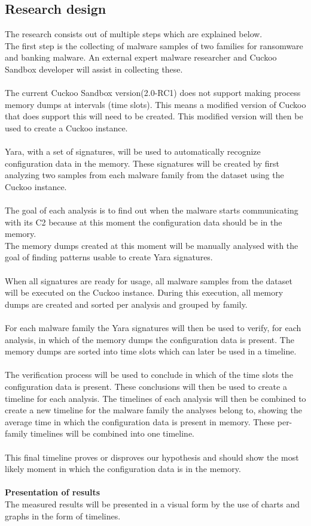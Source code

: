 \documentclass[conference]{IEEEtran}
\begin{document}
\subsection{Research design}
The research consists out of  multiple steps which are explained below.\\

The first step is the collecting of malware samples of two families for ransomware and banking malware. An external expert malware researcher and Cuckoo Sandbox developer will assist in collecting these. \\\\The current Cuckoo Sandbox version(2.0-RC1) does not support making process memory dumps at intervals (\Gls{time slots}). This means a modified version of Cuckoo that does support this will need to be created. This modified version will then be used to create a Cuckoo instance.\\\\Yara, with a set of signatures, will be used to automatically recognize configuration data in the memory. These signatures will be created by first analyzing two samples from each malware family from the dataset using the Cuckoo instance. \\\\The goal of each analysis is to find out when the malware starts communicating with its C2 because at this moment the configuration data should be in the memory.\\The memory dumps created at this moment will be manually analysed with the goal of finding patterns usable to create Yara signatures.\\\\ When all signatures are ready for usage, all malware samples from the dataset will be executed on the Cuckoo instance. During this execution, all memory dumps are created and sorted per analysis and grouped by family.\\\\For each malware family the Yara signatures will then be used to verify, for each analysis, in which of the memory dumps the configuration data is present. The memory dumps are sorted into time slots which can later be used in a timeline.\\\\The verification process will be used to conclude in which of the time slots the configuration data is present. These conclusions will then be used to create a timeline for each analysis.  The timelines of each analysis will then be combined to create a new timeline for the malware family the analyses belong to, showing the average time in which the configuration data is present in memory. These per-family timelines will be combined into one timeline. \\\\This final timeline proves or disproves our hypothesis and should show the most likely moment in which the configuration data is in the memory.\\\\ \textbf{Presentation of results}\\
The measured results will be presented in a visual form by the use of charts and graphs in the form of timelines.
\end{document}
